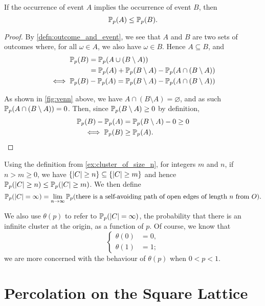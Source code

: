 \documentclass[a4paper, 12pt]{article}
\begin{document}
\begin{lem}[Monotonicity]\label{lem:event_subseteq}
If the occurrence of event $A$ implies the occurrence of event $B$, then $$\mathbb{P}_p(A) \leq \mathbb{P}_p(B).$$
\end{lem}
\begin{proof}
By \cref{defn:outcome_and_event}, we see that $A$ and $B$ are two sets of outcomes where, for all $\omega \in A$, we also have $\omega \in B$. Hence $A \subseteq B$, and 
\begin{align*}
    \mathbb{P}_p(B) 
    &= \mathbb{P}_p(A \cup (B \setminus A))\\
    &= \mathbb{P}_p(A) + \mathbb{P}_p(B \setminus A) - \mathbb{P}_p(A \cap (B \setminus A))\\
    \iff \mathbb{P}_p(B) &- \mathbb{P}_p(A) = \mathbb{P}_p(B \setminus A) - \mathbb{P}_p(A \cap (B \setminus A))
\end{align*}


As shown in \cref{fig:venn} above, we have $A \cap (B \setminus A) = \varnothing$, and as such $\mathbb{P}_p(A \cap (B \setminus A)) = 0$. Then, since $\mathbb{P}_p(B \setminus A) \geq 0$ by definition, 
\begin{align*}
\mathbb{P}_p(B) - \mathbb{P}_p(A) &= \mathbb{P}_p(B \setminus A) - 0 \geq 0\\
\iff \mathbb{P}_p(B) &\geq \mathbb{P}_p(A).
\end{align*}

\end{proof}

\begin{cor}\label{cor:inf_cluster}
Using the definition from \cref{ex:cluster_of_size_n}, for integers $m$ and $n$, if $n > m \geq 0$, we have $\{\lvert C \rvert \geq n\} \subseteq \{\lvert C \rvert \geq m\}$ and hence $\mathbb{P}_p(\lvert C \rvert \geq n) \leq \mathbb{P}_p(\lvert C \rvert \geq m)$. We then define
\[
\mathbb{P}_p(\lvert C \rvert = \infty) 
= \lim_{n \to \infty} \mathbb{P}_p(\text{there is a self-avoiding path of open edges of length } n \text{ from } O).
\]
\end{cor}
We also use $\theta(p)$ to refer to $\mathbb{P}_p(\lvert C \rvert = \infty)$, the probability that there is an infinite cluster at the origin, as a function of $p$. Of course, we know that 
\[\begin{cases}
    \theta(0) &= 0,\\
    \theta(1) &= 1;
\end{cases}\]
we are more concerned with the behaviour of $\theta(p)$ when $0 < p < 1$.

\pagebreak
\section{Percolation on the Square Lattice}\label{sec:Z2}
\end{document}
